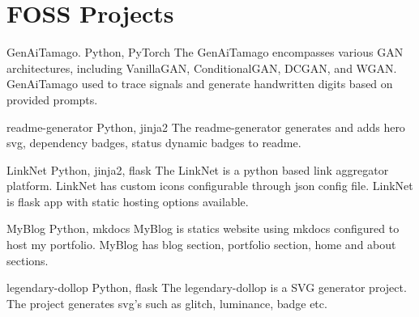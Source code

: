 \documentclass[fontsize=11pt]{tccv}
\begin{document}
\section{FOSS Projects}

\vspace{1em}
\begin{project}
	\item{ GenAiTamago.}
	{Python, PyTorch}
	{The GenAiTamago encompasses various GAN architectures, including VanillaGAN, ConditionalGAN, DCGAN, and WGAN. GenAiTamago used to trace signals and generate handwritten digits based on provided prompts.}\\
\end{project}	
\vspace{1em}

\vspace{1em}
\begin{project}
	\item{ readme-generator}
	{Python, jinja2}
	{The readme-generator generates and adds hero svg, dependency badges, status dynamic badges to readme.}\\
\end{project}	
\vspace{1em}

\vspace{1em}
\begin{project}
	\item{ LinkNet}
	{Python, jinja2, flask}
	{The LinkNet is a python based link aggregator platform. LinkNet has custom icons configurable through json config file.
    LinkNet is flask app with static hosting options available.}\\
\end{project}	
\vspace{1em}

\vspace{1em}
\begin{project}
	\item{ MyBlog }
	{Python,  mkdocs}
	{MyBlog is statics website using mkdocs configured to host my portfolio. MyBlog has blog section, portfolio section, home and about sections.}\\
\end{project}	
\vspace{1em}

\vspace{1em}
\begin{project}
	\item{ legendary-dollop}
	{Python, flask}
	{The legendary-dollop is a SVG generator project. The project generates svg's such as glitch, luminance, badge etc.}\\
\end{project}	
\vspace{1em}
\end{document}
